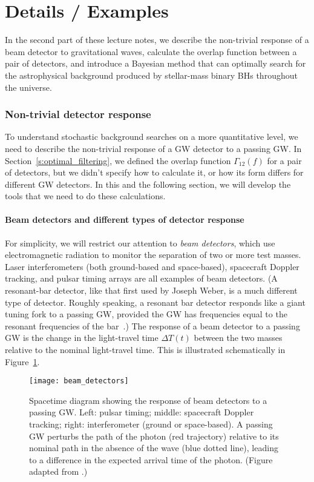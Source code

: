 \part{Details / Examples}
\label{p:details}

In the second part of these lecture notes, 
we describe the non-trivial response of a beam
detector to gravitational waves, calculate the overlap function
between a pair of detectors, and introduce a Bayesian method that
can optimally search for the astrophysical background 
produced by stellar-mass binary BHs throughout the universe.

\section{Non-trivial detector response}
\label{s:nontrivial_response}

To understand stochastic background searches on a 
more quantitative level, we need to describe the 
non-trivial response of a GW detector to a passing GW.
In Section~\ref{s:optimal_filtering}, we defined the 
overlap function $\Gamma_{12}(f)$
for a pair of detectors, but we didn't specify how 
to calculate it, or how its form differs for different
GW detectors.
In this and the following section, we will develop
the tools that we need to do these calculations.

\subsection{Beam detectors and different types of 
detector response}

For simplicity, we will restrict our attention to 
{\em beam detectors}, which use electromagnetic radiation
to monitor the separation of two or more test masses.
Laser interferometers (both ground-based and space-based),
spacecraft Doppler tracking, and pulsar timing arrays
are all examples of beam detectors.
(A resonant-bar detector, like that first used by
Joseph Weber, is a much different type of detector.
Roughly speaking, a resonant bar detector responds
like a giant tuning fork to a passing GW, provided
the GW has frequencies equal to the resonant frequencies 
of the bar~\cite{MTW:1973}.)
The response of a beam detector to a passing GW is 
the change in the light-travel time $\Delta T(t)$ 
between the two 
masses relative to the nominal light-travel time.
This is illustrated schematically in Figure~\ref{f:beam_detectors}.
%
\begin{figure}[htbp!]
\begin{center}
\texttt{[image: beam\_detectors]}
\caption{Spacetime diagram showing the response of beam
detectors to a passing GW.  
Left: pulsar timing; middle: spacecraft Doppler
tracking; right: interferometer (ground or space-based).
A passing GW perturbs the path of the photon (red trajectory) 
relative to its nominal path in the absence of the wave 
(blue dotted line), leading to a 
difference in the expected arrival time of the photon.
(Figure adapted from \cite{Romano-Cornish:2017}.)}
\label{f:beam_detectors}
\end{center}
\end{figure}
%

